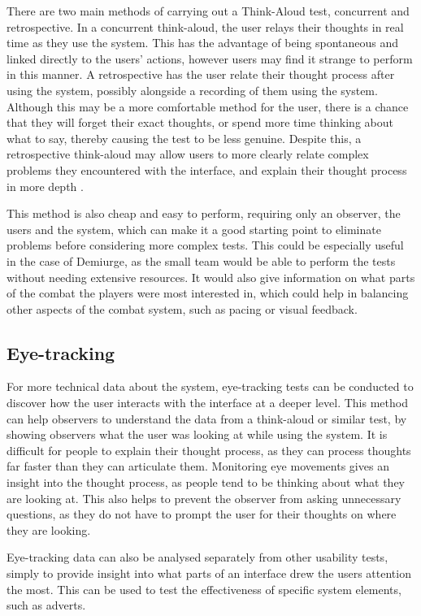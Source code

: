 \documentclass{scrartcl}
\begin{document}
There are two main methods of carrying out a Think-Aloud test, concurrent and retrospective. In a concurrent think-aloud, the user relays their thoughts in real time as they use the system. This has the advantage of being spontaneous and linked directly to the users' actions, however users may find it strange to perform in this manner. A retrospective has the user relate their thought process after using the system, possibly alongside a recording of them using the system. Although this may be a more comfortable method for the user, there is a chance that they will forget their exact thoughts, or spend more time thinking about what to say, thereby causing the test to be less genuine. \cite{eyeAndThink} Despite this, a retrospective think-aloud may allow users to more clearly relate complex problems they encountered with the interface, and explain their thought process in more depth . \cite{concurrentVRetro}

This method is also cheap and easy to perform, requiring only an observer, the users and the system, which can make it a good starting point to eliminate problems before considering more complex tests. This could be especially useful in the case of Demiurge, as the small team would be able to perform the tests without needing extensive resources. It would also give information on what parts of the combat the players were most interested in, which could help in balancing other aspects of the combat system, such as pacing or visual feedback.


\subsection{Eye-tracking}
For more technical data about the system, eye-tracking tests can be conducted to discover how the user interacts with the interface at a deeper level. This method can help observers to understand the data from a think-aloud or similar test, by showing observers what the user was looking at while using the system. It is difficult for people to explain their thought process, as they can process thoughts far faster than they can articulate them. Monitoring eye movements gives an insight into the thought process, as people tend to be thinking about what they are looking at. \cite{eyeTracking} This also helps to prevent the observer from asking unnecessary questions, as they do not have to prompt the user for their thoughts on where they are looking. \cite{eyeAndThink}

Eye-tracking data can also be analysed separately from other usability tests, simply to provide insight into what parts of an interface drew the users attention the most. This can be used to test the effectiveness of specific system elements, such as adverts. 
\end{document}
